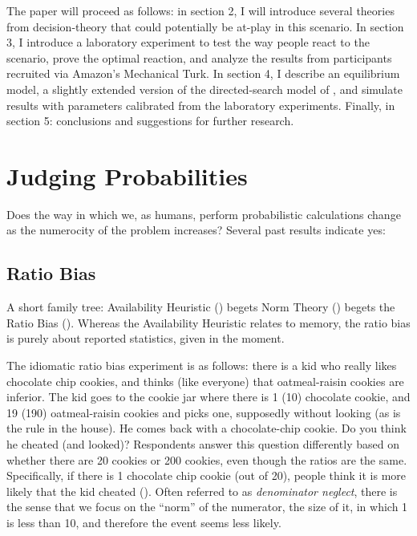 \documentclass[a4paper,12pt]{article}
\begin{document}
The paper will proceed as follows: in section 2, I will introduce several theories from decision-theory that could potentially be at-play in this scenario. In section 3, I introduce a laboratory experiment to test the way people react to the scenario, prove the optimal reaction, and analyze the results from participants recruited via Amazon's Mechanical Turk. In section 4, I describe an equilibrium model, a slightly extended version of the directed-search model of \cite{gonzalez2010}, and simulate results with parameters calibrated from the laboratory experiments. Finally, in section 5: conclusions and suggestions for further research.


\section { Judging Probabilities }

Does the way in which we, as humans, perform probabilistic calculations change as the numerocity of the problem increases? Several past results indicate yes:

\subsection{Ratio Bias}

A short family tree: Availability Heuristic (\cite{tversky1973}) begets Norm Theory (\cite{kahneman1986}) begets the Ratio Bias (\cite{miller1989}). Whereas the Availability Heuristic relates to memory, the ratio bias is purely about reported statistics, given in the moment.

The idiomatic ratio bias experiment is as follows: there is a kid who really likes chocolate chip cookies, and thinks (like everyone) that oatmeal-raisin cookies are inferior. The kid goes to the cookie jar where there is 1 (10) chocolate cookie, and 19 (190) oatmeal-raisin cookies and picks one, supposedly without looking (as is the rule in the house). He comes back with a chocolate-chip cookie. Do you think he cheated (and looked)? Respondents answer this question differently based on whether there are 20 cookies or 200 cookies, even though the ratios are the same. Specifically, if there is 1 chocolate chip cookie (out of 20), people think it is more likely that the kid cheated (\cite{miller1989}). Often referred to as \textit{denominator neglect}, there is the sense that we focus on the ``norm'' of the numerator, the size of it, in which 1 is less than 10, and therefore the event seems less likely.
\end{document}
